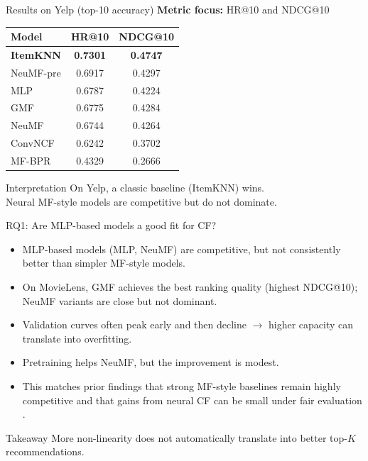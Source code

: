 \documentclass[aspectratio=169,11pt]{beamer}
\begin{document}
\begin{frame}{Results on Yelp (top-10 accuracy)}
\textbf{Metric focus:} HR@10 and NDCG@10

\medgap
\centering
\begin{tabular}{lcc}
\toprule
Model & HR@10 & NDCG@10 \\
\midrule
\textbf{ItemKNN}    & \textbf{0.7301} & \textbf{0.4747} \\
NeuMF-pre  & 0.6917 & 0.4297 \\
MLP        & 0.6787 & 0.4224 \\
GMF        & 0.6775 & 0.4284 \\
NeuMF      & 0.6744 & 0.4264 \\
ConvNCF    & 0.6242 & 0.3702 \\
MF-BPR     & 0.4329 & 0.2666 \\
\bottomrule
\end{tabular}

\medgap
\begin{block}{Interpretation}
On Yelp, a \alert{classic} baseline (ItemKNN) wins.\\
Neural MF-style models are competitive but do not dominate.
\end{block}
\end{frame}


\begin{frame}{RQ1: Are MLP-based models a good fit for CF?}
\begin{itemize}
  \item MLP-based models (MLP, NeuMF) are competitive, but not consistently better than simpler MF-style models.
  \item On MovieLens, GMF achieves the best ranking quality (highest NDCG@10); NeuMF variants are close but not dominant.
  \item Validation curves often peak early and then decline $\rightarrow$ higher capacity can translate into overfitting.
  \item Pretraining helps NeuMF, but the improvement is modest.
  \item This matches prior findings that strong MF-style baselines remain highly competitive and that gains from neural CF can be small under fair evaluation \cite{rendle2020neural,anelli2021reenvisioning}.
\end{itemize}

\medgap
\begin{block}{Takeaway}
More non-linearity does not automatically translate into better top-$K$ recommendations.
\end{block}
\end{frame}
\end{document}
